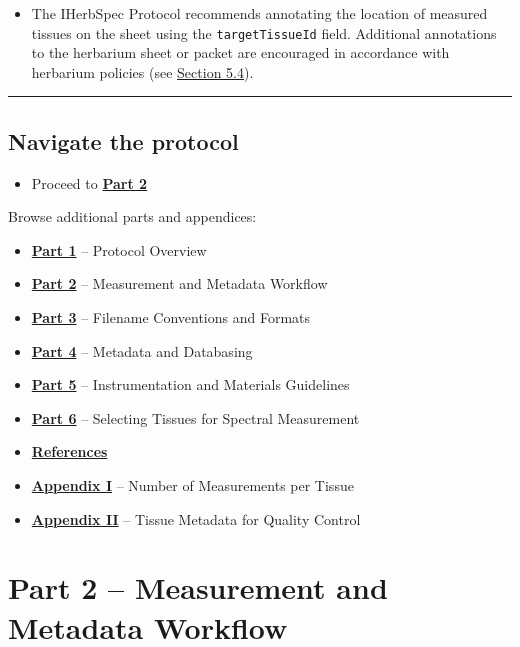 \documentclass[
  letterpaper,
  DIV=11,
  numbers=noendperiod]{scrreprt}
\providecommand{\tightlist}{%
  \setlength{\itemsep}{0pt}\setlength{\parskip}{0pt}}
\begin{document}
\begin{itemize}
\tightlist
\item
  The IHerbSpec Protocol recommends annotating the location of measured
  tissues on the sheet using the \texttt{targetTissueId} field.
  Additional annotations to the herbarium sheet or packet are encouraged
  in accordance with herbarium policies (see
  \hyperref[specimen-and-tissue-annotation]{Section 5.4}).
\end{itemize}

\begin{center}\rule{0.5\linewidth}{0.5pt}\end{center}

\section{Navigate the protocol}\label{navigate-the-protocol-1}

\begin{itemize}
\tightlist
\item
  Proceed to \hyperref[part2]{\textbf{Part 2}}
\end{itemize}

Browse additional parts and appendices:

\begin{itemize}
\tightlist
\item
  \hyperref[part1]{\textbf{Part 1}} -- Protocol Overview
\item
  \hyperref[part2]{\textbf{Part 2}} -- Measurement and Metadata Workflow
\item
  \hyperref[part3]{\textbf{Part 3}} -- Filename Conventions and Formats
\item
  \hyperref[part4]{\textbf{Part 4}} -- Metadata and Databasing
\item
  \hyperref[part5]{\textbf{Part 5}} -- Instrumentation and Materials
  Guidelines
\item
  \hyperref[part6]{\textbf{Part 6}} -- Selecting Tissues for Spectral
  Measurement
\item
  \hyperref[references]{\textbf{References}}
\item
  \hyperref[app1]{\textbf{Appendix I}} -- Number of Measurements per
  Tissue
\item
  \hyperref[app2]{\textbf{Appendix II}} -- Tissue Metadata for Quality
  Control
\end{itemize}


\chapter{Part 2 -- Measurement and Metadata
Workflow}\label{part-2-measurement-and-metadata-workflow}
\end{document}
